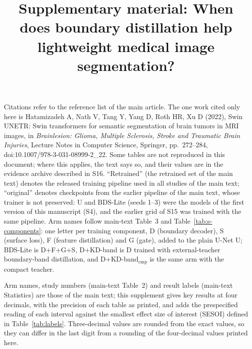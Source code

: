 \documentclass[10pt]{article}
\title{Supplementary material: When does boundary distillation help lightweight medical image segmentation?}
\date{}
\begin{document}
\maketitle
\noindent Citations refer to the reference list of the main article. The one work cited only here is Hatamizadeh A, Nath V, Tang Y, Yang D, Roth HR, Xu D (2022), Swin UNETR: Swin transformers for semantic segmentation of brain tumors in MRI images, in \emph{Brainlesion: Glioma, Multiple Sclerosis, Stroke and Traumatic Brain Injuries}, Lecture Notes in Computer Science, Springer, pp.~272--284, doi:10.1007/978-3-031-08999-2\_22. Some tables are not reproduced in this document; where this applies, the text says so, and their values are in the evidence archive described in S16. ``Retrained'' (the retrained set of the main text) denotes the released training pipeline used in all studies of the main text; ``original'' denotes checkpoints from the earlier pipeline of the main text, whose trainer is not preserved: U and BDS-Lite (seeds 1--3) were the models of the first version of this manuscript (S4), and the earlier grid of S15 was trained with the same pipeline. Arm names follow main-text Table~3 and Table~\ref{tab:s-components}: one letter per training component, D (boundary decoder), S (surface loss), F (feature distillation) and G (gate), added to the plain U-Net U; BDS-Lite is D+F+G+S, D+KD-band is D trained with external-teacher boundary-band distillation, and D+KD-band$_{\mathrm{cmp}}$ is the same arm with the compact teacher.

Arm names, study numbers (main-text Table~2) and result labels (main-text Statistics) are those of the main text; this supplement gives key results at four decimals, with the precision of each table as printed, and adds the prespecified reading of each interval against the smallest effect size of interest (SESOI) defined in Table~\ref{tab:labels}. Three-decimal values are rounded from the exact values, so they can differ in the last digit from a rounding of the four-decimal values printed here.
\end{document}
